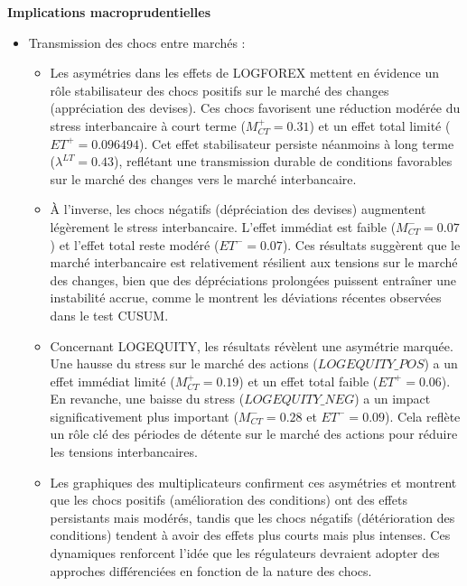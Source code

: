 \textbf{Implications macroprudentielles} \\

\begin{itemize}
    \item Transmission des chocs entre marchés :
    \begin{itemize}
        \item Les asymétries dans les effets de LOGFOREX mettent en évidence un rôle stabilisateur des chocs positifs sur le marché des changes (appréciation des devises). Ces chocs favorisent une réduction modérée du stress interbancaire à court terme (\(M_{CT}^{+} = 0.31\)) et un effet total limité (\(ET^{+} = 0.096494\)). Cet effet stabilisateur persiste néanmoins à long terme (\(\lambda^{LT} = 0.43\)), reflétant une transmission durable de conditions favorables sur le marché des changes vers le marché interbancaire.
        \item À l’inverse, les chocs négatifs (dépréciation des devises) augmentent légèrement le stress interbancaire. L’effet immédiat est faible (\(M_{CT}^{-} = 0.07\)) et l’effet total reste modéré (\(ET^{-} = 0.07\)). Ces résultats suggèrent que le marché interbancaire est relativement résilient aux tensions sur le marché des changes, bien que des dépréciations prolongées puissent entraîner une instabilité accrue, comme le montrent les déviations récentes observées dans le test CUSUM.
        \item Concernant LOGEQUITY, les résultats révèlent une asymétrie marquée. Une hausse du stress sur le marché des actions (\(LOGEQUITY\_POS\)) a un effet immédiat limité (\(M_{CT}^{+} = 0.19\)) et un effet total faible (\(ET^{+} = 0.06\)). En revanche, une baisse du stress (\(LOGEQUITY\_NEG\)) a un impact significativement plus important (\(M_{CT}^{-} = 0.28\) et \(ET^{-} = 0.09\)). Cela reflète un rôle clé des périodes de détente sur le marché des actions pour réduire les tensions interbancaires.
        \item Les graphiques des multiplicateurs confirment ces asymétries et montrent que les chocs positifs (amélioration des conditions) ont des effets persistants mais modérés, tandis que les chocs négatifs (détérioration des conditions) tendent à avoir des effets plus courts mais plus intenses. Ces dynamiques renforcent l'idée que les régulateurs devraient adopter des approches différenciées en fonction de la nature des chocs.
    \end{itemize}


\end{itemize}
